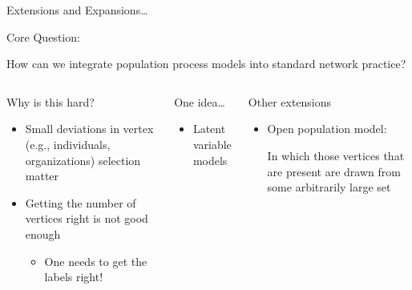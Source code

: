 \documentclass[10pt]{beamer}
\begin{document}
\begin{frame}{Extensions and Expansions\dots}


\begin{block}{Core Question:}
\begin{center}
How can we integrate population process models into standard network practice?
\end{center}
\end{block}

\begin{columns}


\begin{block}{Why is this hard?}
\begin{itemize}
\item Small deviations in vertex (e.g., individuals, organizations) selection matter
\item Getting the number of vertices right is not good enough
\begin{itemize}
\item One needs to get the labels right!
\end{itemize}
\end{itemize}
\end{block}


\begin{block}{One idea\dots}
\begin{itemize}
\item Latent variable models \citep{valluvanPoster12}
\end{itemize}
\end{block}

\begin{block}{Other extensions}
\begin{itemize}
\item Open population model:

In which those vertices that are present are drawn from some arbitrarily large set
\end{itemize}
\end{block}

\end{columns}

\end{frame}
\end{document}
